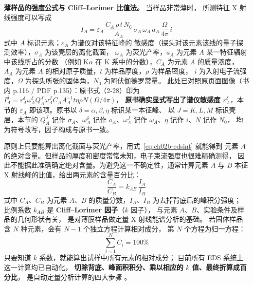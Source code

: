 \begin{principle}
\textbf{薄样品的强度公式与 Cliff--Lorimer 比值法。} 当样品非常薄时，
所测特征 X 射线强度可以写成
\begin{equation}
I_A=\varepsilon_A\,\frac{C_A\,\rho\,t\,N_0}{A_A}\,\sigma_A\,\omega_A\,a_A\,\frac{\Omega}{4\pi}\,i
\label{eq:ch02b-edsint}
\end{equation}
式中 $A$ 标识元素；$\varepsilon_A$ 为谱仪对该特征峰的
敏感度（探头对该元素该线的量子探测效率），$\sigma_A$ 为该壳层的离化截面，
$\omega_A$ 为荧光产率，$a_A$ 为元素 $A$ 某一特征辐射中该线所占的分数
（例如 K$\alpha$ 在 K 系中的分数），$C_A$ 为元素 $A$ 的质量浓度，
$A_A$ 为元素 $A$ 的相对原子质量，$t$ 为样品厚度，$\rho$ 为样品密度，
$i$ 为入射电子流强度，$\Omega$ 为探头所张的固体角，$N_0$ 为阿伏伽德罗常量。
此处已对照原页面图像（书内 p.116 / PDF p.135）：原书式（2-28）印为
$I_A^{\delta}=\varepsilon_A^{\delta}\omega_A^{\delta}Q_A^{J}\omega_A^{J}C_AA_A^{-1}t\eta\rho N(\Omega/4\pi)$，
\textbf{原书确实显式写出了谱仪敏感度 $\varepsilon_A^{\delta}$}，本节的
$\varepsilon_A$ 即该项。原书以 $\delta=\alpha,\beta,\eta$ 标识某一本征峰、
以 $J=K,L,M$ 标识壳层，本节的 $Q_A^{J}$ 记作 $\sigma_A$、$\omega_A^{\delta}$ 记作
$a_A$、$\omega_A^{J}$ 记作 $\omega_A$、$\eta$ 记作 $i$、$N$ 记作 $N_0$，
均为符号改写，因子构成与原书一致。

原则上只要能算出离化截面与荧光产率，用式~\eqref{eq:ch02b-edsint} 就能得到
元素 $A$ 的绝对含量。但样品的厚度和密度常常未知，电子束流强度也很难精确测得，
因此不能据此准确确定绝对含量。为避免这一不确定性，通常计算元素 $A$ 与 $B$
本征 X 射线峰的比值，给出两元素的含量百分比：
\begin{equation}
\frac{C_A}{C_B}=k_{AB}\,\frac{I_A}{I_B}
\label{eq:ch02b-cl}
\end{equation}
式中 $C_A$、$C_B$ 为元素 $A$、$B$ 的质量分数，$I_A$、$I_B$ 为去掉背底后的峰积分强度；
比例系数 $k_{AB}$ 是 \textbf{Cliff--Lorimer 因子}（$k$ 因子），
与元素 $A$、$B$、实验条件及样品的几何形状有关，
是对薄膜样品做定量 X 射线能谱分析的基础。
若固体样品含 $N$ 种元素，会有 $N-1$ 个独立方程计算相对成分，
第 $N$ 个方程为归一方程：
\begin{equation}
\sum_{i=1}^{N} C_i = 100\%
\label{eq:ch02b-norm}
\end{equation}
只要知道 $k$ 系数，就能算出试样中所有元素的相对成分；
目前所有 EDS 系统上这一计算均已自动化，
\textbf{切除背底、峰面积积分、乘以相应的 $k$ 值、最终折算成百分比}，
是自动定量分析计算的四大步骤
。


\end{principle}
